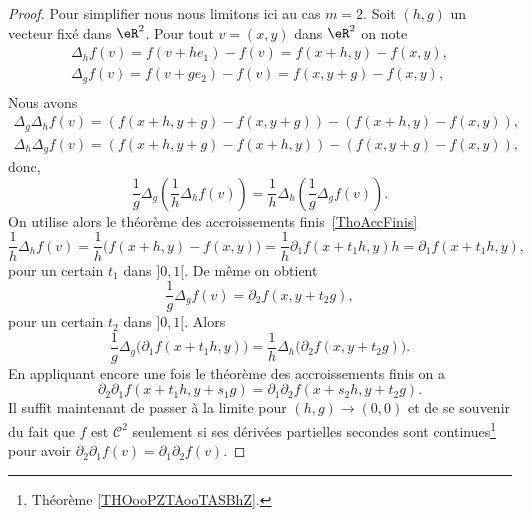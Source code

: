\begin{proof}
	Pour simplifier nous nous limitons ici au cas \( m=2\). Soit \( (h,g)\) un vecteur fixé dans \( \eR^2\). Pour tout  \( v=(x,y)\) dans \( \eR^2\) on note
	\begin{equation}
		\begin{array}{c}
			\Delta_h f(v)=f(v+he_1) -f(v) = f(x+h,y)-f(x,y), \\
			\Delta_g f(v)=f(v+ge_2) -f(v) = f(x,y+g)-f(x,y), \\
		\end{array}
	\end{equation}
	Nous avons
	\begin{equation}
		\begin{array}{c}
			\Delta_g   \Delta_h f(v)=\left(f(x+h,y+g)-f(x,y+g)\right)-\left(f(x+h,y)-f(x,y)\right), \\
			\Delta_h   \Delta_g f(v)=\left(f(x+h,y+g)-f(x+h,y)\right)-\left(f(x,y+g)-f(x,y)\right),
		\end{array}
	\end{equation}
	donc,
	\begin{equation}
		\frac{1}{g} \Delta_g  \left(\frac{1}{h} \Delta_h f(v)\right) = \frac{1}{h} \Delta_h \left(\frac{1}{g} \Delta_g f(v)\right).
	\end{equation}
	On utilise alors le théorème des accroissements finis~\ref{ThoAccFinis}
	\begin{equation}
		\frac{1}{h} \Delta_h f(v)=\frac{1}{h}\big(f(x+h,y)-f(x,y)\big)=\frac{1}{h}\partial_1f(x+t_1h,y )h=\partial_1f(x+t_1h, y),
	\end{equation}
	pour un certain \( t_1\) dans \( ]0,1[\). De même on obtient
	\[
		\frac{1}{g} \Delta_g f(v)= \partial_2 f(x, y+t_2g),
	\]
	pour un certain \( t_2\) dans \( ]0,1[\). Alors
	\begin{equation}
		\frac{1}{g} \Delta_g  \big(\partial_1f(x+t_1h, y)\big) = \frac{1}{h} \Delta_h \big(\partial_2 f(x, y+t_2g)\big).
	\end{equation}
	En appliquant encore une fois le théorème des accroissements finis on a
	\begin{equation}
		\partial_2\partial_1f(x+t_1h, y+s_1g) = \partial_1\partial_2 f(x+s_2h, y+t_2g).
	\end{equation}
	Il suffit maintenant de passer à la limite pour \( (h,g) \to (0,0)\) et de se souvenir du fait que \( f\) est \( \mathcal{C}^2\) seulement si ses dérivées partielles secondes sont continues\footnote{Théorème \ref{THOooPZTAooTASBhZ}.} pour avoir \( \partial_2\partial_1f(v)=\partial_1\partial_2 f(v)\).
\end{proof}
